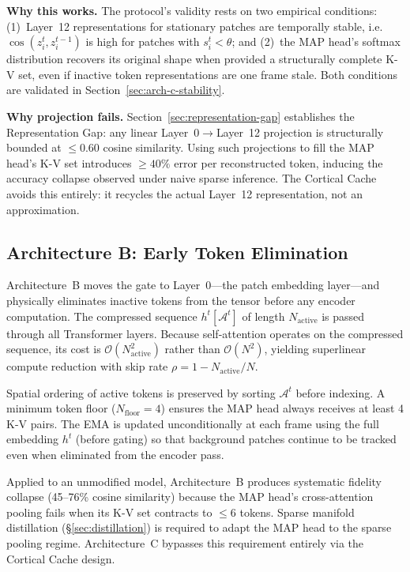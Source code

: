\documentclass{article}
\begin{document}
\textbf{Why this works.}
The protocol's validity rests on two empirical conditions: (1)~Layer~12
representations for stationary patches are temporally stable,
i.e.\ $\cos(z_i^t, z_i^{t-1})$ is high for patches with $s_i^t < \theta$;
and (2)~the MAP head's softmax distribution recovers its original shape
when provided a structurally complete K-V set, even if inactive token
representations are one frame stale. Both conditions are validated in
Section~\ref{sec:arch-c-stability}.

\textbf{Why projection fails.}
Section~\ref{sec:representation-gap} establishes the Representation Gap:
any linear Layer~0$\to$Layer~12 projection is structurally bounded at
$\leq 0.60$ cosine similarity. Using such projections to fill the MAP
head's K-V set introduces $\geq 40\%$ error per reconstructed token,
inducing the accuracy collapse observed under naive sparse inference.
The Cortical Cache avoids this entirely: it recycles the actual Layer~12
representation, not an approximation.

\subsection{Architecture B: Early Token Elimination}
\label{sec:arch-b}

Architecture~B moves the gate to Layer~0---the patch embedding
layer---and physically eliminates inactive tokens from the tensor before
any encoder computation. The compressed sequence $h^t[\mathcal{A}^t]$
of length $N_{\text{active}}$ is passed through all Transformer layers.
Because self-attention operates on the compressed sequence, its cost is
$\mathcal{O}(N_{\text{active}}^2)$ rather than $\mathcal{O}(N^2)$,
yielding superlinear compute reduction with skip rate
$\rho = 1 - N_{\text{active}}/N$.

Spatial ordering of active tokens is preserved by sorting $\mathcal{A}^t$
before indexing. A minimum token floor ($N_{\mathrm{floor}} = 4$) ensures
the MAP head always receives at least 4 K-V pairs. The EMA is updated
unconditionally at each frame using the full embedding $h^t$ (before
gating) so that background patches continue to be tracked even when
eliminated from the encoder pass.

Applied to an unmodified model, Architecture~B produces systematic
fidelity collapse (45--76\% cosine similarity) because the MAP head's
cross-attention pooling fails when its K-V set contracts to $\leq$6
tokens. Sparse manifold distillation (§\ref{sec:distillation}) is
required to adapt the MAP head to the sparse pooling regime.
Architecture~C bypasses this requirement entirely via the Cortical Cache
design.
\end{document}

